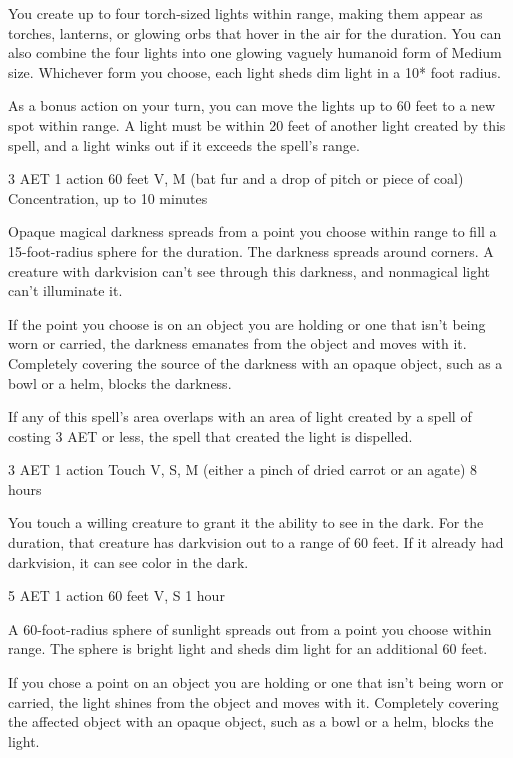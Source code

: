 You create up to four torch-sized lights within range, making them appear as torches, lanterns, or glowing orbs that hover in the air for the duration. You can also combine the four lights into one glowing vaguely humanoid form of Medium size. Whichever form you choose, each light sheds dim light in a 10* foot radius.

As a bonus action on your turn, you can move the lights up to 60 feet to a new spot within range. A light must be within 20 feet of another light created by this spell, and a light winks out if it exceeds the spell's range.


{3 AET}
{1 action}
{60 feet}
{V, M (bat fur and a drop of pitch or piece of coal)}
{Concentration, up to 10 minutes}

Opaque magical darkness spreads from a point you choose within range to fill a 15-foot-radius sphere for the duration. The darkness spreads around corners. A creature with darkvision can't see through this darkness, and nonmagical light can't illuminate it.

If the point you choose is on an object you are holding or one that isn't being worn or carried, the darkness emanates from the object and moves with it. Completely covering the source of the darkness with an opaque object, such as a bowl or a helm, blocks the darkness.

If any of this spell's area overlaps with an area of light created by a spell of costing 3 AET or less, the spell that created the light is dispelled.


{3 AET}
{1 action}
{Touch}
{V, S, M (either a pinch of dried carrot or an agate)}
{8 hours}

You touch a willing creature to grant it the ability to see in the dark. For the duration, that creature has darkvision out to a range of 60 feet. If it already had darkvision, it can see color in the dark.


{5 AET}
{1 action}
{60 feet}
{V, S}
{1 hour}

A 60-foot-radius sphere of sunlight spreads out from a point you choose within range. The sphere is bright light and sheds dim light for an additional 60 feet.

If you chose a point on an object you are holding or one that isn't being worn or carried, the light shines from the object and moves with it. Completely covering the affected object with an opaque object, such as a bowl or a helm, blocks the light.

